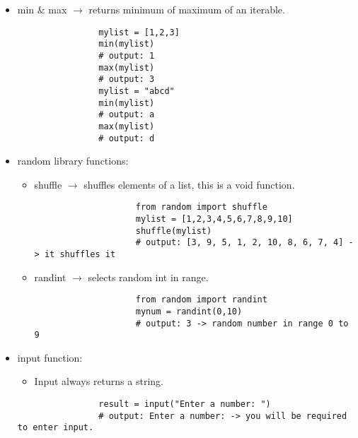 \begin{itemize}
    \item min \& max $\rightarrow$ returns minimum of maximum of an iterable. 
            \begin{verbatim}
                mylist = [1,2,3]
                min(mylist)
                # output: 1
                max(mylist)
                # output: 3
                mylist = "abcd"
                min(mylist)
                # output: a
                max(mylist)
                # output: d
            \end{verbatim}
    
    \item random library functions: 
        \begin{itemize}
            \item shuffle $\rightarrow$ shuffles elements of a list, this is a void function. 
                \begin{verbatim}
                    from random import shuffle 
                    mylist = [1,2,3,4,5,6,7,8,9,10]
                    shuffle(mylist)
                    # output: [3, 9, 5, 1, 2, 10, 8, 6, 7, 4] -> it shuffles it
                \end{verbatim}

            \item randint $\rightarrow$ selects random int in range.
                \begin{verbatim}
                    from random import randint 
                    mynum = randint(0,10)
                    # output: 3 -> random number in range 0 to 9
                \end{verbatim}
        \end{itemize}
    
    \item input function: 
        \begin{itemize}
            \item Input always returns a string.
        \end{itemize}
            \begin{verbatim}
                result = input("Enter a number: ")
                # output: Enter a number: -> you will be required to enter input.
            \end{verbatim}
\end{itemize}


